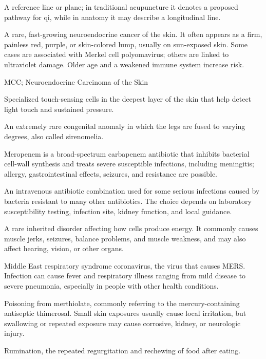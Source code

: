  A reference line or plane; in traditional acupuncture it denotes a proposed pathway for qi, while in anatomy it may describe a longitudinal line.

 A rare, fast-growing neuroendocrine cancer of the skin. It often appears as a firm, painless red, purple, or skin-colored lump, usually on sun-exposed skin. Some cases are associated with Merkel cell polyomavirus; others are linked to ultraviolet damage. Older age and a weakened immune system increase risk.

\synonyms
MCC; Neuroendocrine Carcinoma of the Skin

 Specialized touch-sensing cells in the deepest layer of the skin that help detect light touch and sustained pressure.

 An extremely rare congenital anomaly in which the legs are fused to varying degrees, also called sirenomelia.

 Meropenem is a broad-spectrum carbapenem antibiotic that inhibits bacterial cell-wall synthesis and treats severe susceptible infections, including meningitis; allergy, gastrointestinal effects, seizures, and resistance are possible.

 An intravenous antibiotic combination used for some serious infections caused by bacteria resistant to many other antibiotics. The choice depends on laboratory susceptibility testing, infection site, kidney function, and local guidance.

 A rare inherited disorder affecting how cells produce energy. It commonly causes muscle jerks, seizures, balance problems, and muscle weakness, and may also affect hearing, vision, or other organs.

 Middle East respiratory syndrome coronavirus, the virus that causes MERS. Infection can cause fever and respiratory illness ranging from mild disease to severe pneumonia, especially in people with other health conditions.

 Poisoning from merthiolate, commonly referring to the mercury-containing antiseptic thimerosal. Small skin exposures usually cause local irritation, but swallowing or repeated exposure may cause corrosive, kidney, or neurologic injury.

 Rumination, the repeated regurgitation and rechewing of food after eating.

